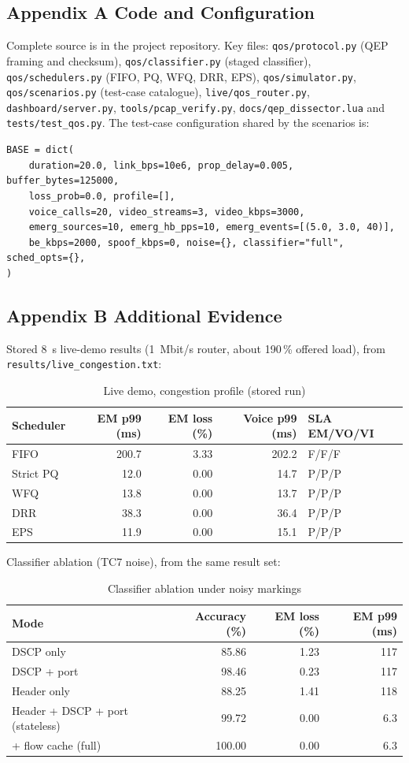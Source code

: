 \documentclass[12pt,a4paper]{article}
\newcommand{\code}[1]{\texttt{#1}}
\begin{document}
\subsection*{Appendix A \quad Code and Configuration}
Complete source is in the project repository. Key files:
\code{qos/protocol.py} (QEP framing and checksum), \code{qos/classifier.py} (staged classifier),
\code{qos/schedulers.py} (FIFO, PQ, WFQ, DRR, EPS), \code{qos/simulator.py}, \code{qos/scenarios.py}
(test-case catalogue), \code{live/qos\_router.py}, \code{dashboard/server.py},
\code{tools/pcap\_verify.py}, \code{docs/qep\_dissector.lua} and \code{tests/test\_qos.py}.
The test-case configuration shared by the scenarios is:
\begin{lstlisting}
BASE = dict(
    duration=20.0, link_bps=10e6, prop_delay=0.005, buffer_bytes=125000,
    loss_prob=0.0, profile=[],
    voice_calls=20, video_streams=3, video_kbps=3000,
    emerg_sources=10, emerg_hb_pps=10, emerg_events=[(5.0, 3.0, 40)],
    be_kbps=2000, spoof_kbps=0, noise={}, classifier="full", sched_opts={},
)
\end{lstlisting}

\subsection*{Appendix B \quad Additional Evidence}
Stored 8~s live-demo results (1~Mbit/s router, about 190\,\% offered load), from
\code{results/live\_congestion.txt}:
\begin{table}[H]\centering\small
\caption{Live demo, congestion profile (stored run)}\label{tab:live}
\begin{tabular}{|l|r|r|r|l|}\hline
\textbf{Scheduler} & \textbf{EM p99 (ms)} & \textbf{EM loss (\%)} & \textbf{Voice p99 (ms)} & \textbf{SLA EM/VO/VI}\\\hline
FIFO & 200.7 & 3.33 & 202.2 & F/F/F\\\hline
Strict PQ & 12.0 & 0.00 & 14.7 & P/P/P\\\hline
WFQ & 13.8 & 0.00 & 13.7 & P/P/P\\\hline
DRR & 38.3 & 0.00 & 36.4 & P/P/P\\\hline
EPS & 11.9 & 0.00 & 15.1 & P/P/P\\\hline
\end{tabular}
\end{table}
Classifier ablation (TC7 noise), from the same result set:
\begin{table}[H]\centering\small
\caption{Classifier ablation under noisy markings}\label{tab:ablation}
\begin{tabular}{|l|r|r|r|}\hline
\textbf{Mode} & \textbf{Accuracy (\%)} & \textbf{EM loss (\%)} & \textbf{EM p99 (ms)}\\\hline
DSCP only & 85.86 & 1.23 & 117\\\hline
DSCP + port & 98.46 & 0.23 & 117\\\hline
Header only & 88.25 & 1.41 & 118\\\hline
Header + DSCP + port (stateless) & 99.72 & 0.00 & 6.3\\\hline
+ flow cache (full) & 100.00 & 0.00 & 6.3\\\hline
\end{tabular}
\end{table}
\end{document}
